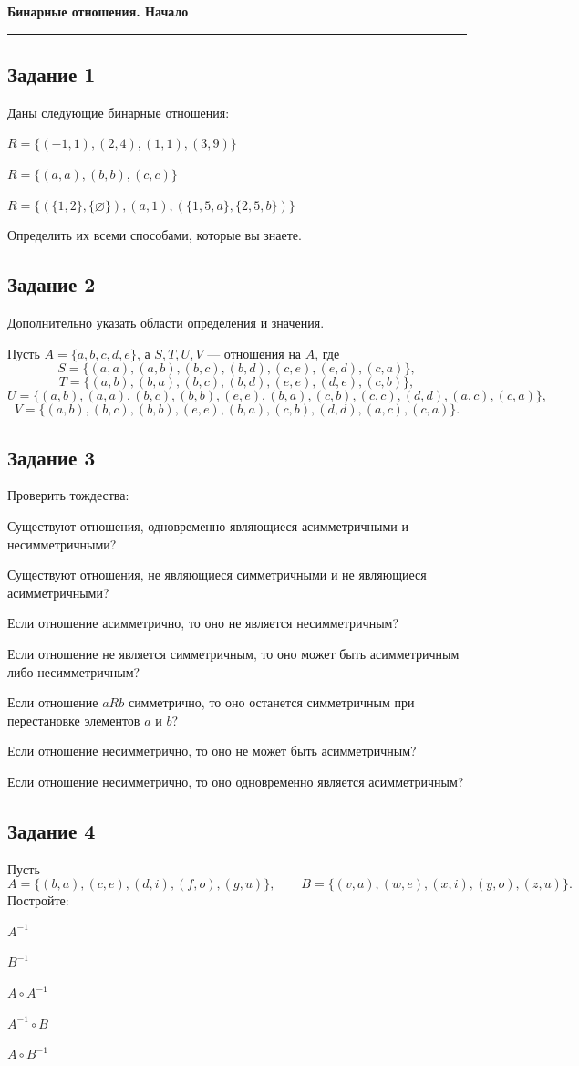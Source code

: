 \documentclass[a4paper,12pt,oneside]{article}
\newcommand{\Task}[1]{%
  \subsection*{#1}%
  \vspace{-0.2\baselineskip}%
}
\begin{document}
\begin{center}
    {\Large\bfseries Бинарные отношения. Начало}\\[1mm]
\end{center}
\vspace{2mm}
\hrule
\vspace{4mm}

\Task{Задание 1}
Даны следующие бинарные отношения:
\begin{numlist}
    \item $R=\{(-1,1),(2,4),(1,1),(3,9)\}$
    \item $R=\{(a,a),(b,b),(c,c)\}$
    \item $R=\bigl\{(\{1,2\},\{\varnothing\}),(a,1),(\{1,5,a\},\{2,5,b\})\bigr\}$
\end{numlist}
Определить их всеми способами, которые вы знаете.

\Task{Задание 2}
Дополнительно указать области определения и значения.

Пусть $A=\{a,b,c,d,e\}$, а $S,T,U,V$ — отношения на $A$, где
\[
S=\{(a,a),(a,b),(b,c),(b,d),(c,e),(e,d),(c,a)\},
\]
\[
T=\{(a,b),(b,a),(b,c),(b,d),(e,e),(d,e),(c,b)\},
\]
\[
U=\{(a,b),(a,a),(b,c),(b,b),(e,e),(b,a),(c,b),(c,c),(d,d),(a,c),(c,a)\},
\]
\[
V=\{(a,b),(b,c),(b,b),(e,e),(b,a),(c,b),(d,d),(a,c),(c,a)\}.
\]

\Task{Задание 3}
Проверить тождества:
\begin{numlist}
    \item Существуют отношения, одновременно являющиеся асимметричными и несимметричными?
    \item Существуют отношения, не являющиеся симметричными и не являющиеся асимметричными?
    \item Если отношение асимметрично, то оно не является несимметричным?
    \item Если отношение не является симметричным, то оно может быть асимметричным либо несимметричным?
    \item Если отношение $aRb$ симметрично, то оно останется симметричным при перестановке элементов $a$ и $b$?
    \item Если отношение несимметрично, то оно не может быть асимметричным?
    \item Если отношение несимметрично, то оно одновременно является асимметричным?
\end{numlist}

\Task{Задание 4}
Пусть
\[
A=\{(b,a),(c,e),(d,i),(f,o),(g,u)\},\qquad
B=\{(v,a),(w,e),(x,i),(y,o),(z,u)\}.
\]
Постройте:
\begin{numlist}
    \item $A^{-1}$
    \item $B^{-1}$
    \item $A\circ A^{-1}$
    \item $A^{-1}\circ B$
    \item $A\circ B^{-1}$
\end{numlist}
\end{document}
